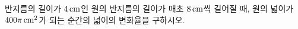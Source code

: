 반지름의 길이가 $4\mkern3mu \mathrm{cm}$인 원의 반지름의 길이가 매초 $8\mkern3mu \mathrm{cm}$씩 길어질 때, 원의 넓이가 $400\pi\mkern3mu \mathrm{cm}^2$가 되는 순간의 넓이의 변화율을 구하시오.
